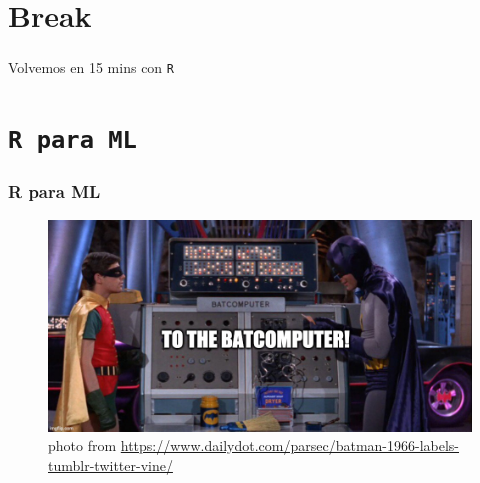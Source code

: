 \documentclass[
  shownotes,
  xcolor={svgnames},
  hyperref={colorlinks,citecolor=DarkBlue,linkcolor=DarkRed,urlcolor=DarkBlue}
  , aspectratio=169]{beamer}
\begin{document}
\section{Break}
\begin{frame}
\frametitle{}

\begin{centering}
\huge
\textcolor{andesred}{Volvemos en 15 mins con \texttt{R} }

\end{centering}

\end{frame}
\section{\texttt{R para ML}}
\begin{frame}
\frametitle{R para ML}

\begin{figure}[H] \centering
  \centering
  \includegraphics[scale=0.35]{../Lecture04/figures/baticomputer_meme.jpg}
  \\
  \tiny photo from \url{https://www.dailydot.com/parsec/batman-1966-labels-tumblr-twitter-vine/}
\end{figure}

\end{frame}
\end{document}
